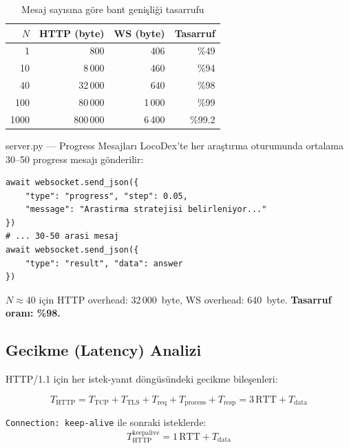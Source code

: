 \begin{table}[H]
\centering
\caption{Mesaj say{\i}s{\i}na g\"{o}re bant geni\c{s}li\u{g}i tasarrufu}
\label{tab:bandwidth}
\begin{tabularx}{0.85\textwidth}{rrrr}
\toprule
\color{chapterBlue}\textbf{$N$} & \color{chapterBlue}\textbf{HTTP (byte)} & \color{chapterBlue}\textbf{WS (byte)} & \color{chapterBlue}\textbf{Tasarruf} \\
\midrule
1    & 800      & 406   & \%49 \\
10   & 8\,000   & 460   & \%94 \\
40   & 32\,000  & 640   & \%98 \\
100  & 80\,000  & 1\,000 & \%99 \\
1000 & 800\,000 & 6\,400 & \%99.2 \\
\bottomrule
\end{tabularx}
\end{table}

\begin{kodref}{server.py --- Progress Mesajlar{\i}}
LocoDex'te her ara\c{s}t{\i}rma oturumunda ortalama 30--50 progress mesaj{\i} g\"{o}nderilir:
\begin{lstlisting}
await websocket.send_json({
    "type": "progress", "step": 0.05,
    "message": "Arastirma stratejisi belirleniyor..."
})
# ... 30-50 arasi mesaj
await websocket.send_json({
    "type": "result", "data": answer
})
\end{lstlisting}
$N \approx 40$ i\c{c}in HTTP overhead: 32\,000~byte, WS overhead: 640~byte. \textbf{Tasarruf oran{\i}: \%98.}
\end{kodref}


\subsection{Gecikme (Latency) Analizi}
\label{sec:latency}

HTTP/1.1 i\c{c}in her istek-yan{\i}t d\"{o}ng\"{u}s\"{u}ndeki gecikme bile\c{s}enleri:

\begin{equation}
\label{eq:http-latency}
T_{\mathrm{HTTP}} = T_{\mathrm{TCP}} + T_{\mathrm{TLS}} + T_{\mathrm{req}} + T_{\mathrm{process}} + T_{\mathrm{resp}} = 3\,\text{RTT} + T_{\mathrm{data}}
\end{equation}

\texttt{Connection: keep-alive} ile sonraki isteklerde:
\begin{equation}
\label{eq:http-keepalive}
T_{\mathrm{HTTP}}^{\mathrm{keepalive}} = 1\,\text{RTT} + T_{\mathrm{data}}
\end{equation}

